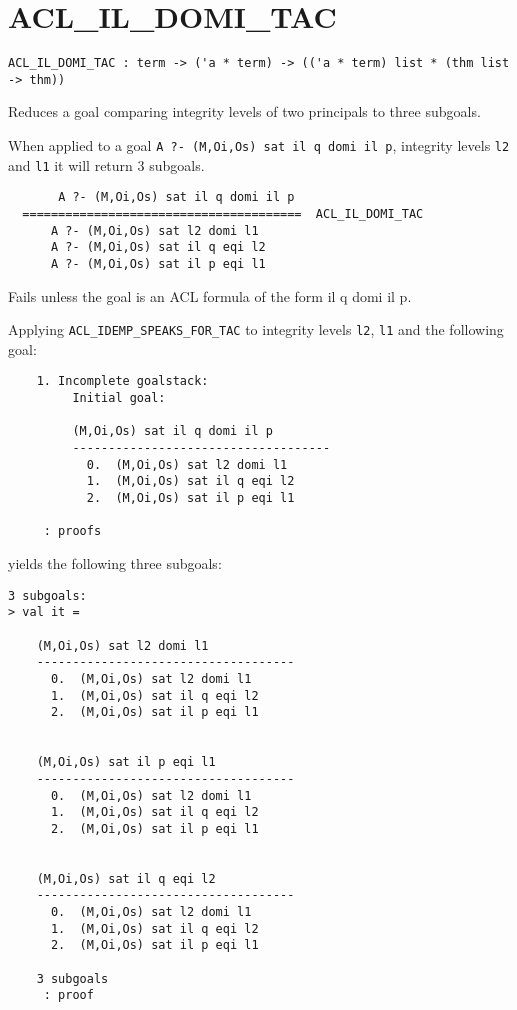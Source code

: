 \SEEALSO
\ENDDOC

\section{ACL\_IL\_DOMI\_TAC}



\small
\begin{lstlisting}[breaklines]
ACL_IL_DOMI_TAC : term -> ('a * term) -> (('a * term) list * (thm list -> thm))
\end{lstlisting}\egroup


\SYNOPSIS
Reduces a goal comparing integrity levels of two principals to three subgoals.

\DESCRIBE When applied to a goal \texttt{A ?- (M,Oi,Os) sat il q domi il p}, integrity levels \texttt{l2} and \texttt{l1} it will return 3 subgoals.
\begin{verbatim}
       A ?- (M,Oi,Os) sat il q domi il p
  =======================================  ACL_IL_DOMI_TAC
      A ?- (M,Oi,Os) sat l2 domi l1
      A ?- (M,Oi,Os) sat il q eqi l2
      A ?- (M,Oi,Os) sat il p eqi l1

\end{verbatim}

\FAILURE 
Fails unless the goal is an ACL formula of the form il q domi il p.

\EXAMPLE
Applying \texttt{ACL\_IDEMP\_SPEAKS\_FOR\_TAC} to integrity levels \texttt{l2}, \texttt{l1} and  the following goal:
\begin{holboxed}
\begin{verbatim}
    1. Incomplete goalstack:
         Initial goal:
    
         (M,Oi,Os) sat il q domi il p
         ------------------------------------
           0.  (M,Oi,Os) sat l2 domi l1
           1.  (M,Oi,Os) sat il q eqi l2
           2.  (M,Oi,Os) sat il p eqi l1
    
     : proofs
\end{verbatim}
\end{holboxed}
yields the following three subgoals:
\begin{holboxed}
\begin{verbatim}
3 subgoals:
> val it =
    
    (M,Oi,Os) sat l2 domi l1
    ------------------------------------
      0.  (M,Oi,Os) sat l2 domi l1
      1.  (M,Oi,Os) sat il q eqi l2
      2.  (M,Oi,Os) sat il p eqi l1
    
    
    (M,Oi,Os) sat il p eqi l1
    ------------------------------------
      0.  (M,Oi,Os) sat l2 domi l1
      1.  (M,Oi,Os) sat il q eqi l2
      2.  (M,Oi,Os) sat il p eqi l1
    
    
    (M,Oi,Os) sat il q eqi l2
    ------------------------------------
      0.  (M,Oi,Os) sat l2 domi l1
      1.  (M,Oi,Os) sat il q eqi l2
      2.  (M,Oi,Os) sat il p eqi l1
    
    3 subgoals
     : proof
\end{verbatim}
\end{holboxed}

